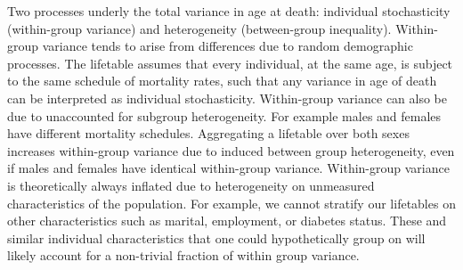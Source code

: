 \documentclass[12pt,oneside,a4paper]{article} %
\theoremstyle{definition}
\begin{document}
Two processes underly the total variance in age at death: individual
stochasticity (within-group variance) and heterogeneity (between-group
inequality). Within-group variance tends to arise from differences due to random
demographic processes. The lifetable assumes that every individual, at the same age, is subject
to the same schedule of mortality rates, such that any
variance in age of death can be interpreted as individual stochasticity.
Within-group variance can also be due to unaccounted for subgroup heterogeneity.
For example males and females have different mortality schedules. Aggregating
a lifetable over both sexes increases within-group variance due to induced
between group heterogeneity, even if males and females have identical
within-group variance. Within-group variance is theoretically always inflated
due to heterogeneity on unmeasured characteristics of the population. For
example, we cannot stratify our lifetables on other characteristics such as
marital, employment, or diabetes status. These and similar individual
characteristics that one could hypothetically group on will likely account for a
non-trivial fraction of within group variance.
\end{document}

